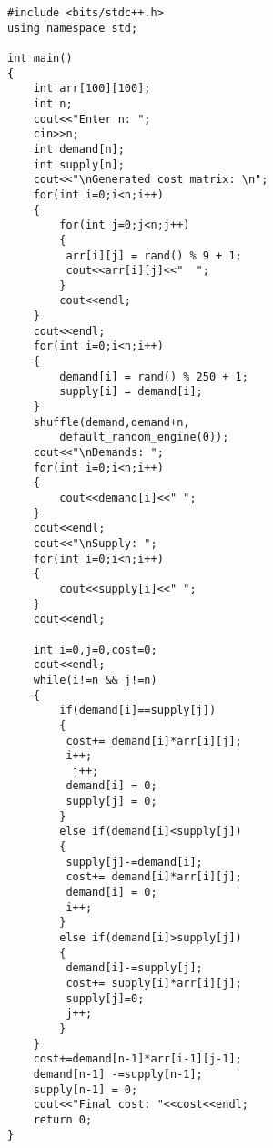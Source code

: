 \documentclass[10pt]{article}
\begin{document}
\begin{multicols*}{2}
\begin{lstlisting}
#include <bits/stdc++.h>
using namespace std;

int main()
{
	int arr[100][100];
	int n;
	cout<<"Enter n: ";
	cin>>n;
	int demand[n];
	int supply[n];
	cout<<"\nGenerated cost matrix: \n";
	for(int i=0;i<n;i++)
	{
		for(int j=0;j<n;j++)
		{
		 arr[i][j] = rand() % 9 + 1;
		 cout<<arr[i][j]<<"  ";
		}
		cout<<endl;
	}
	cout<<endl;
	for(int i=0;i<n;i++)
	{
		demand[i] = rand() % 250 + 1;
		supply[i] = demand[i];
	}
	shuffle(demand,demand+n,
	    default_random_engine(0));
	cout<<"\nDemands: ";
	for(int i=0;i<n;i++)
	{
		cout<<demand[i]<<" ";
	}
	cout<<endl;
	cout<<"\nSupply: ";
	for(int i=0;i<n;i++)
	{
		cout<<supply[i]<<" ";
	}
	cout<<endl;
	
	int i=0,j=0,cost=0;
	cout<<endl;
	while(i!=n && j!=n)
	{
		if(demand[i]==supply[j])
		{
		 cost+= demand[i]*arr[i][j];
		 i++;
		  j++;
		 demand[i] = 0;
		 supply[j] = 0;
		}
		else if(demand[i]<supply[j])	
		{	
		 supply[j]-=demand[i];
		 cost+= demand[i]*arr[i][j];
		 demand[i] = 0;
		 i++;
		}
		else if(demand[i]>supply[j])
		{
		 demand[i]-=supply[j];
		 cost+= supply[i]*arr[i][j];
		 supply[j]=0;
		 j++;
		}
	}
	cost+=demand[n-1]*arr[i-1][j-1];
	demand[n-1] -=supply[n-1];
	supply[n-1] = 0;
	cout<<"Final cost: "<<cost<<endl;
	return 0;
}
\end{lstlisting}
\end{multicols*}
\clearpage

	
\end{document}
